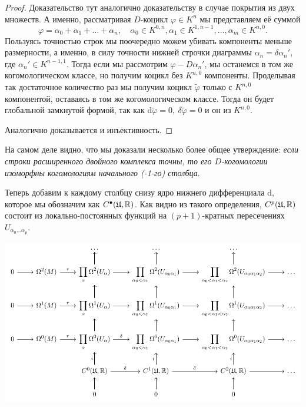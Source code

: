 	 \begin{proof}
	 	Доказательство тут аналогично доказательству в случае покрытия из двух множеств. А именно, рассматривая $D$-коцикл $\varphi \in K^n$ мы представляем её суммой 
	 	\[
	 		\varphi = \alpha_0 + \alpha_1 + \ldots + \alpha_n, \quad \alpha_0 \in K^{0, n}, \alpha_1 \in K^{1, n - 1}, \ldots, \alpha_m \in K^{n, 0}.
	 	\]
	 	Пользуясь точностью строк мы поочередно можем убивать компоненты меньше размерности, а именно, в силу точности нижней строчки диаграммы $\alpha_n = \delta \alpha_n'$, где $\alpha_n' \in K^{n - 1, 1}$. Тогда если мы рассмотрим $\varphi - D\alpha_n'$, мы останемся в том же когомологическом классе, но получим коцикл без $K^{n, 0}$ компоненты. Проделывая так достаточное количество раз мы получим коцикл $\widetilde{\varphi}$ только с $K^{n, 0}$ компонентой, оставаясь в том же когомологическом классе. Тогда он будет глобальной замкнутой формой, так как $\mathrm{d}\widetilde{\varphi} = 0, \ \delta\widetilde{\varphi} = 0$ и он из $K^{n, 0}$. 

	 	Аналогично доказывается и инъективность. 
	 \end{proof}

	 На самом деле видно, что мы доказали несколько более общее утверждение: \emph{если строки расширенного двойного комплекса точны, то его $D$-когомологии изоморфны когомологиям начального (-1-го) столбца}. 


	 Теперь добавим к каждому столбцу снизу ядро нижнего дифференциала $\mathrm{d}$, которое мы обозначим как $C^{\bullet}(\mathfrak{U}, \mathbb{R})$. Как видно из такого определения, $C^{p}(\mathfrak{U}, \mathbb{R})$ состоит из локально-постоянных функций на $(p+1)$-кратных пересечениях $U_{\alpha_0 \ldots \alpha_p}$.

	 \begin{center}
	 	\includegraphics{lectures/7/pictures/cd_38.pdf}
	 \end{center}

